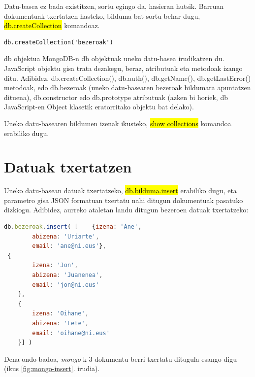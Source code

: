 Datu-basea ez bada existitzen, sortu egingo da, hasieran hutsik. Barruan dokumentuak txertatzen hasteko, bilduma bat sortu behar dugu, \hl{db.createCollection} komandoaz.

\begin{lstlisting}[numbers=none]
db.createCollection('bezeroak')    
\end{lstlisting}

\begin{alertinfo}{db objektua}
MongoDB-n db objektuak uneko datu-basea irudikatzen du. JavaScript objektu gisa trata dezakegu, beraz, atributuak eta metodoak izango ditu. Adibidez, db.createCollection(), db.auth(), db.getName(), db.getLastError() metodoak, edo db.bezeroak (uneko datu-basearen bezeroak bildumara apuntatzen dituena), db.constructor edo db.prototype atributuak (azken bi horiek, db JavaScript-en Object klasetik eratorritako objektu bat delako).
\end{alertinfo}

Uneko datu-basearen bildumen izenak ikusteko, \hl{show collections} komandoa erabiliko dugu.

\section{Datuak txertatzen}

Uneko datu-basean datuak txertatzeko, \hl{db.bilduma.insert} erabiliko dugu, eta parametro gisa JSON formatuan txertatu nahi ditugun dokumentuak pasatuko dizkiogu. Adibidez, aurreko ataletan landu ditugun bezeroen datuak txertatzeko:

\begin{lstlisting}[language=JavaScript, numbers=none]
db.bezeroak.insert( [    {izena: 'Ane',
        abizena: 'Uriarte',
        email: 'ane@ni.eus'},
 {
        izena: 'Jon',
        abizena: 'Juanenea',
        email: 'jon@ni.eus'
    },
    {
        izena: 'Oihane',
        abizena: 'Lete',
        email: 'oihane@ni.eus'
    }] )
\end{lstlisting}

Dena ondo badoa, \textit{mongo}-k 3 dokumentu berri txertatu ditugula esango digu (ikus \ref{fig:mongo-insert}. irudia).


